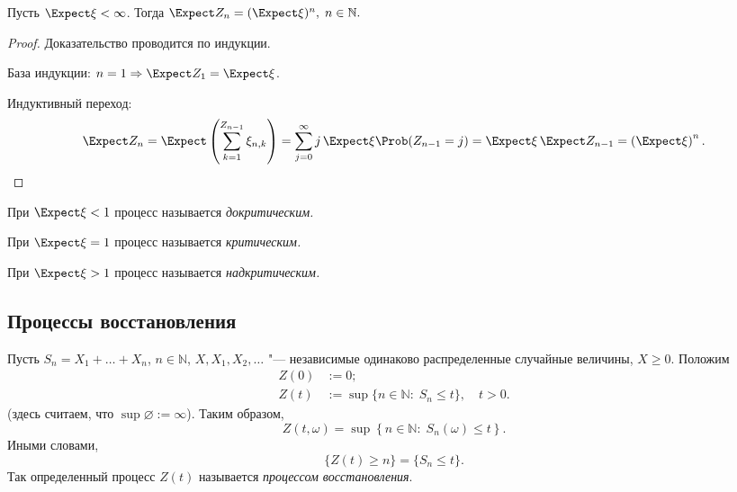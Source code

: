 \begin{cor}
  Пусть $\Expect \xi < \infty$. Тогда $\Expect Z_{n} = (\Expect \xi)^{n},\; n \in \mathbb{N}{.}$
\end{cor}

\begin{proof}
  Доказательство проводится по индукции.

  База индукции: $n=1 \Rightarrow \Expect Z_{1} = \Expect \xi$.

  Индуктивный переход:
  \begin{equation*}
    \Expect Z_{n} = \Expect \left( \sum_{k=1}^{Z_{n-1}} \xi_{n,k} \right) = \sum\limits_{j=0}^{\infty} j \, \Expect \xi \Prob (Z_{n-1} = j) = \Expect \xi \, \Expect Z_{n-1} = \left(\Expect \xi \right)^{n}.
  \end{equation*}
\end{proof}

\begin{df}\mbox{}

  При $\Expect \xi < 1$ процесс называется \emph{докритическим.}

  При $\Expect \xi = 1$ процесс называется \emph{критическим.}

  При $\Expect \xi > 1$ процесс называется \emph{надкритическим.}
\end{df}

\subsection{Процессы восстановления}

\begin{df}
  Пусть $S_{n} = X_{1} + \ldots + X_{n}$, $n \in \mathbb{N}$, $X, X_{1}, X_{2}, \ldots$ "--- независимые одинаково распределенные случайные величины, $X \geqslant 0$. Положим
  \begin{align*}
    Z(0) &:= 0;\\
    Z(t) &:= \sup \lbrace n \in \mathbb{N}:\; S_{n} \leqslant t \rbrace{,}\quad t > 0.
  \end{align*}
  (здесь считаем, что $\sup \varnothing := \infty$). Таким образом,
  \begin{equation*}
    Z(t, \omega) = \sup \left\lbrace n \in \mathbb{N}: \; S_{n}(\omega) \leqslant t \right\rbrace{.}
  \end{equation*}
  Иными словами,
  \begin{equation*}
    \lbrace Z(t) \geqslant n \rbrace = \lbrace S_{n} \leqslant t \rbrace{.}
  \end{equation*}
  Так определенный процесс $Z(t)$ называется \emph{процессом восстановления}.
\end{df}

